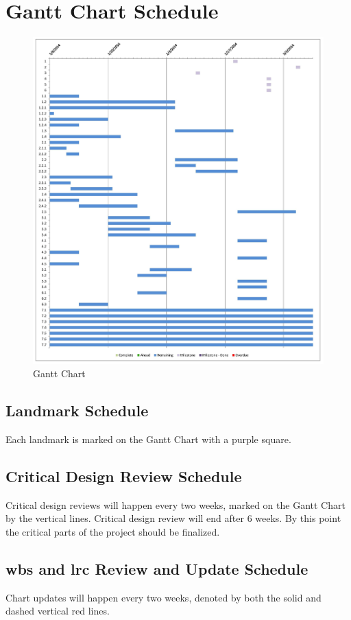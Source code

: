 \section{Gantt Chart Schedule}
\begin{figure}[H]
\centering
\includegraphics[width=1\textwidth]{gantt.jpg}
\caption{Gantt Chart}
\label{fig:Gantt Chart}
\end{figure}
\subsection{Landmark Schedule}
Each landmark is marked on the Gantt Chart with a purple square.
\subsection{Critical Design Review Schedule}
Critical design reviews will happen every two weeks, marked on the Gantt Chart by the vertical lines.
Critical design review will end after 6 weeks. By this point the critical parts of the project should be finalized. 
\subsection{\gls{wbs} and \gls{lrc} Review and Update Schedule}
Chart updates will happen every two weeks, denoted by both the solid and dashed vertical red lines.
